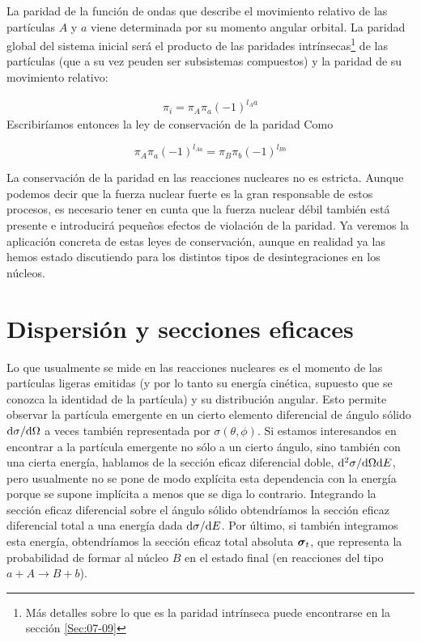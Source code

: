 
La paridad de la función de ondas que describe el movimiento relativo de las partículas $A$ y $a$ viene determinada por su momento angular orbital. La paridad global del sistema inicial será el producto de las paridades intrínsecas\footnote{Más detalles sobre lo que es la paridad intrínseca puede encontrarse en la sección \ref{Sec:07-09}} de las partículas (que a su vez peuden ser subsistemas compuestos) y la paridad de su movimiento relativo:

\begin{eqnarray}
    \pi_i = \pi_A \pi_a (-1)^{l_Aa}
\end{eqnarray}
Escribiríamos entonces la ley de conservación de la paridad Como

\begin{mybox}
\begin{equation}
    \pi_A \pi_a (-1)^{l_{Aa}} = \pi_B \pi_b (-1)^{l_{Bb}}
\end{equation}
\end{mybox}

La conservación de la paridad en las reacciones nucleares no es estricta. Aunque podemos decir que la fuerza nuclear fuerte es la gran responsable de estos procesos, es necesario tener en cunta que la fuerza nuclear débil también está presente e introducirá pequeños efectos de violación de la paridad. Ya veremos la aplicación concreta de estas leyes de conservación, aunque en realidad ya las hemos estado discutiendo para los distintos tipos de desintegraciones en los núcleos.

\section{Dispersión y secciones eficaces}

Lo que usualmente se mide en las reacciones nucleares es el momento de las partículas ligeras emitidas (y por lo tanto su energía cinética, supuesto que se conozca la identidad de la partícula) y su distribución angular. Esto permite observar la partícula emergente en un cierto elemento diferencial de ángulo sólido $\mathrm{d} \sigma / \mathrm{d} \Omega$ a veces también representada por $\sigma (\theta, \phi)$. Si estamos interesandos en encontrar a la partícula emergente no sólo a un cierto ángulo, sino también con una cierta energía, hablamos de la sección eficaz diferencial doble, $\mathrm{d}^2 \sigma / \mathrm{d} \Omega \mathrm{d} E$, pero usualmente no se pone de modo explícita esta dependencia con la energía porque se supone implícita a menos que se diga lo contrario. Integrando la sección eficaz diferencial sobre el ángulo sólido obtendríamos la sección eficaz diferencial total a una energía dada $\mathrm{d} \sigma / \mathrm{d} E$. Por último, si también integramos esta energía, obtendríamos la sección eficaz total absoluta $\boldsymbol{\sigma}_t$, que representa la probabilidad de formar al núcleo $B$ en el estado final (en reacciones del tipo $a+A\longrightarrow B + b$). 

